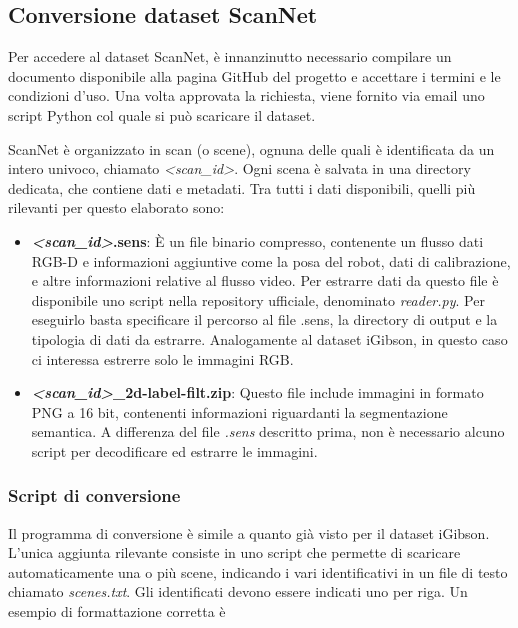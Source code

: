 \documentclass[12pt]{report}
\begin{document}
\subsection{Conversione dataset ScanNet}
\label{sec:conversione_dataset_scannet}

Per accedere al dataset ScanNet, è innanzinutto necessario compilare un documento disponibile alla pagina GitHub del progetto e accettare i termini e le condizioni d'uso. Una volta approvata la richiesta, viene fornito via email uno script Python col quale si può scaricare il dataset.

ScanNet è organizzato in scan (o scene), ognuna delle quali è identificata da un intero univoco, chiamato \textit{<scan\_id>}. Ogni scena è salvata in una directory dedicata, che contiene dati e metadati. Tra tutti i dati disponibili, quelli più rilevanti per questo elaborato sono:

\begin{itemize}
	\item \textbf{\textit{<scan\_id>}.sens}: È un file binario compresso, contenente un flusso dati RGB-D e informazioni aggiuntive come la posa del robot, dati di calibrazione, e altre informazioni relative al flusso video. Per estrarre dati da questo file è disponibile uno script nella repository ufficiale, denominato \textit{reader.py}. Per eseguirlo basta specificare il percorso al file .sens, la directory di output e la tipologia di dati da estrarre. Analogamente al dataset iGibson, in questo caso ci interessa estrerre solo le immagini RGB.
	
	\item \textbf{\textit{<scan\_id>}\_2d-label-filt.zip}: Questo file include immagini in formato PNG a 16 bit, contenenti informazioni riguardanti la segmentazione semantica. A differenza del file \textit{.sens} descritto prima, non è necessario alcuno script per decodificare ed estrarre le immagini.
\end{itemize}

\subsubsection{Script di conversione}
\label{sec:script_di_conversione_scannet}

Il programma di conversione è simile a quanto già visto per il dataset iGibson. L'unica aggiunta rilevante consiste in uno script che permette di scaricare automaticamente una o più scene, indicando i vari identificativi in un file di testo chiamato \textit{scenes.txt}. Gli identificati devono essere indicati uno per riga. Un esempio di formattazione corretta è
\end{document}
